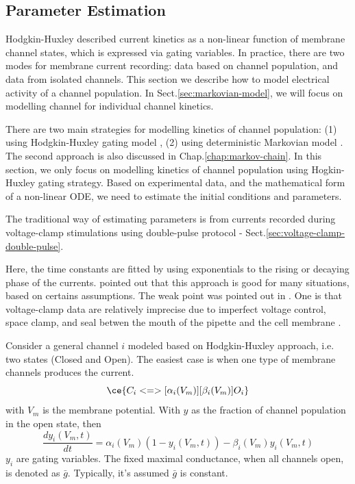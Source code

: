 \subsection{Parameter Estimation}

Hodgkin-Huxley described current kinetics as a non-linear function of membrane
channel states, which is expressed via gating variables. In practice, there are
two modes for membrane current recording: data based on channel population, and
data from isolated channels. This section we describe how to model electrical
activity of a channel population.
In Sect.\ref{sec:markovian-model}, we will focus on modelling channel for
individual channel kinetics.

There are two main strategies for modelling kinetics of channel population: (1)
using Hodgkin-Huxley gating model \citep{nelson1990}, (2) using deterministic
Markovian model \citep{patlak1991}. The second approach is also discussed in
Chap.\ref{chap:markov-chain}. In this section, we only focus on
modelling kinetics of channel population using Hogkin-Huxley gating strategy.
Based on experimental data, and the mathematical form of a non-linear ODE, we
need to estimate the initial conditions and parameters.

The traditional way of estimating parameters is from currents recorded during
voltage-clamp stimulations using double-pulse protocol -
Sect.\ref{sec:voltage-clamp-double-pulse}.

Here, the time constants are fitted by using exponentials to the rising or
decaying phase of the currents. \citep{beaumont1993} pointed out that this
approach is good for many situations, based on certains assumptions. The weak
point was pointed out in \citep{willms1999, willms2002}. One is that
voltage-clamp data are relatively imprecise due to imperfect voltage control,
space clamp, and seal betwen the mouth of the pipette and the cell membrane
\citep{hamill1981}.


Consider a general channel $i$ modeled based on Hodgkin-Huxley approach,
i.e.
two states (Closed and Open). The easiest case is when one type of membrane
channels produces the current.
\begin{equation}
\ce{C_i <=>[\alpha_i(V_m)][\beta_i(V_m)] O_i}
\end{equation}
with $V_m$ is the membrane potential. With $y$ as the fraction of channel
population in the open state, then
\begin{equation}
\frac{dy_i(V_m,t)}{dt} = \alpha_i(V_m)(1-y_i(V_m,t)) - \beta_i(V_m)y_i(V_m,t)
\label{eq:vg_12}
\end{equation}
$y_i$ are gating variables. The fixed maximal conductance, when all channels
open, is denoted as $\bar{g}$. Typically, it's assumed $\bar{g}$ is constant.

